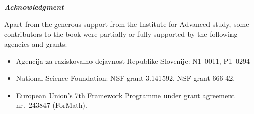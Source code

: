{\bigskip

\noindent
\emph{\textbf{\small Acknowledgment}}

\medskip

\noindent
Apart from the generous support from the Institute for Advanced study, some contributors
to the book were partially or fully supported by the following agencies and grants:
%
\begin{itemize}
\item Agencija za raziskovalno dejavnost Republike Slovenije: N1--0011, P1--0294
\item National Science Foundation: NSF grant 3.141592, NSF grant 666-42.
\item European Union's 7th Framework Programme under grant agreement nr.\ 243847 (ForMath).
\end{itemize}
}
\cleartooddpage

